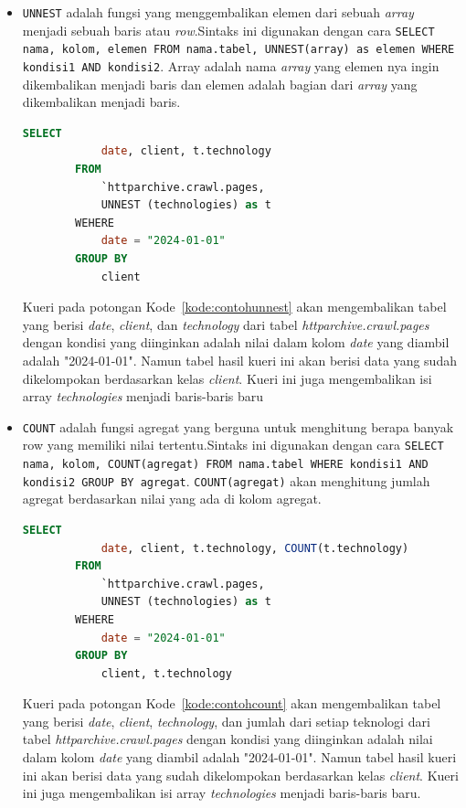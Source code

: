 \begin{itemize}
    \item \verb|UNNEST| adalah fungsi yang menggembalikan elemen dari sebuah \textit{array} menjadi sebuah baris atau \textit{row}.Sintaks ini digunakan dengan cara \verb|SELECT nama, kolom, elemen FROM nama.tabel, UNNEST(array) as elemen WHERE kondisi1 AND kondisi2|. Array adalah nama \textit{array} yang elemen nya ingin dikembalikan menjadi baris dan elemen adalah bagian dari \textit{array} yang dikembalikan menjadi baris.
      \begin{lstlisting}[language=SQL, caption=contoh penggunaan sintaks \lstinline|UNNEST|, label=kode:contohunnest]
        SELECT
            date, client, t.technology
        FROM
            `httparchive.crawl.pages,
            UNNEST (technologies) as t
        WEHERE
            date = "2024-01-01"
        GROUP BY
            client
    \end{lstlisting}
     Kueri pada potongan Kode~\ref{kode:contohunnest} akan mengembalikan tabel yang berisi \textit{date}, \textit{client}, dan \textit{technology} dari tabel \textit{httparchive.crawl.pages} dengan kondisi yang diinginkan adalah nilai dalam kolom \textit{date} yang diambil adalah "2024-01-01". Namun tabel hasil kueri ini akan berisi data yang sudah dikelompokan berdasarkan kelas \textit{client}. Kueri ini juga mengembalikan isi array \textit{technologies} menjadi baris-baris baru
     
    \item \verb|COUNT| adalah fungsi agregat yang berguna untuk menghitung berapa banyak row yang memiliki nilai tertentu.Sintaks ini digunakan dengan cara \verb|SELECT nama, kolom, COUNT(agregat) FROM nama.tabel WHERE kondisi1 AND kondisi2 GROUP BY agregat|. \verb|COUNT(agregat)| akan menghitung jumlah agregat berdasarkan nilai yang ada di kolom agregat.
    \begin{lstlisting}[language=SQL, caption=contoh penggunaan sintaks \lstinline|COUNT|, label=kode:contohcount]
        SELECT
            date, client, t.technology, COUNT(t.technology)
        FROM
            `httparchive.crawl.pages,
            UNNEST (technologies) as t
        WEHERE
            date = "2024-01-01"
        GROUP BY
            client, t.technology
    \end{lstlisting}
     Kueri pada potongan Kode~\ref{kode:contohcount} akan mengembalikan tabel yang berisi \textit{date}, \textit{client}, \textit{technology}, dan jumlah dari setiap teknologi dari tabel \textit{httparchive.crawl.pages} dengan kondisi yang diinginkan adalah nilai dalam kolom \textit{date} yang diambil adalah "2024-01-01". Namun tabel hasil kueri ini akan berisi data yang sudah dikelompokan berdasarkan kelas \textit{client}. Kueri ini juga mengembalikan isi array \textit{technologies} menjadi baris-baris baru.
     

\end{itemize}
